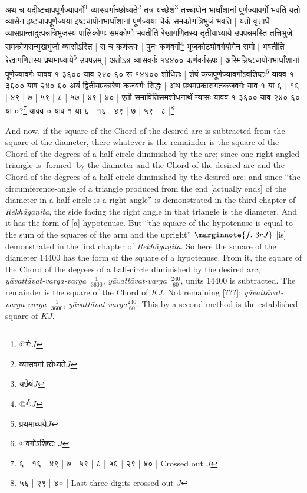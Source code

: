 \documentclass[12pt]{book}
\let\*=\d
\def\RG{\textit{Rekh\=a\-ga\*ni\-ta}}
\def\yava{\textit{y\=avat\-t\=avat-varga}}
\def\yavava{\textit{y\=avat\-t\=avat-varga-varga}}
\begin{document}
\newpage

{\s अथ च यदीष्टचापपूर्णज्यावर्गो\footnote{{\s @र्गः}$J$} व्यासवर्गाच्छोध्यते\footnote{{\s व्यासवर्गा छोध्यते}$J$} तत्र यच्छेशं\footnote{{\s यछेषं}$J$} तच्चापोन-भार्धांशानां पूर्णज्यावर्गो भवति
यतो व्यासेन इष्टचापपूर्णज्यया
इष्टचापोनभार्धांशानां पूर्णज्यया चैकं समकोणत्रिभुजं भवति |
यतो वृत्तार्धे
व्यासप्रान्तादुत्पन्नत्रिभुजस्य पालिकोणः समकोणो भवतीति रेखागणितस्य तृतीयाध्याये उपपन्नमस्ति
तत्त्रिभुजे समकोणसन्मुखभुजो व्यासोऽस्ति | स च कर्णरूपः | पुनः
कर्णवर्गो\footnote{{\s @र्गः}$J$} भुजकोट्योवर्गयोगेन समो $|$ भवतीति रेखागणितस्य
प्रथमाध्याये\footnote{{\s प्रथमाध्यये}$J$} उपपन्नम् | अतोऽत्र व्यासवर्गः १४४०० कर्णवर्गरूपः |
अस्मिन्निष्टचापोन\-भार्धांशानां पूर्णज्यावर्गः यावव १ ३६०० याव २४० ६० रू १४४०० शोधितः | शेषं कजपूर्णज्यावर्गोऽवशिष्टः\footnote{{\s @वर्गोऽशिष्टः} $J$} यावव १ ३६०० याव २४० ६०
अयं द्वितीयप्रकारेण कजवर्गः सिद्धः | अथ प्रथमप्रकारागतकजवर्गः याव १ या ६ | १६ | ४९ | ७ | ५९ | ८ | ५७ | ४९ | ४० |
एतौ समावितिसमशोधनार्थं न्यासः यावव १ ३६०० याव २४० ६०
या ०?\footnote{{\s ६ | १६ | ४९ | ७ | ५९ | ८ | ५६ | २९ | ४० |} Crossed out $J$}
यावव ० याव १ या
६ | १६ | ४९ | ७ | ५९ | ८ |\footnote{ {\s ५६ | २९ | ४० |}  Last three digits crossed out $J$}}

\newpage

And now, if the square of the Chord of the desired arc is subtracted from the 
square of the diameter, there whatever is the remainder is the square of 
the Chord of the degrees of a half-circle diminished by the arc; since one
right-angled triangle is [formed] by the diameter and the Chord of the 
desired arc and the Chord of the degrees of a half-circle diminished by the
desired arc; and since ``the circumference-angle 
of a triangle produced from the end [actually ends]
of the diameter in a half-circle is a 
right angle'' is demonstrated in the third chapter of \RG,
the side facing the right angle in that triangle is the diameter. And it 
has the form of [a] hypotenuse. But ``the square of  the hypotenuse
is equal to the sum of the squares of the arm and the upright''
$\marginnote{f.~3r J}$ [is] demonstrated in the first chapter  of \RG. So here the square of the diameter
14400 has the form of the square of a hypotenuse. From it, the square of the 
Chord of the degrees of a half-circle diminished by the desired arc,
\yavava\ $\frac{1}{3600}$, \yava\ $\frac{240}{60}$, units 14400 is subtracted.
The remainder is the square of the Chord of $KJ$. Not remaining [???]: 
\yavava\ $\frac{1}{3600}$, \yava $\frac{240}{60}$. This by a second method
is the established square of $KJ$.
\end{document}
